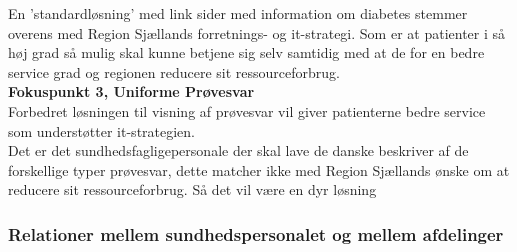 En 'standardløsning' med link sider med information om diabetes stemmer overens med Region Sjællands forretnings- og it-strategi. 
Som er at patienter i så høj grad så mulig skal kunne betjene sig selv samtidig med at de for en bedre service grad og regionen reducere sit ressourceforbrug.\\
%
\textbf{Fokuspunkt 3, Uniforme Prøvesvar}\\
Forbedret løsningen til visning af prøvesvar vil giver patienterne bedre service som understøtter it-strategien.\\
Det er det sundhedsfagligepersonale der skal lave de danske beskriver af de forskellige typer prøvesvar, dette matcher ikke med Region Sjællands ønske om at reducere sit ressourceforbrug. Så det vil være en dyr løsning\\
%
\subsubsection{Relationer mellem sundhedspersonalet og mellem afdelinger}